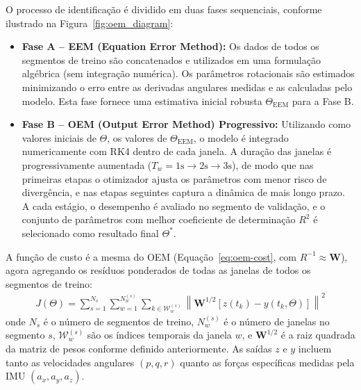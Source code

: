 \documentclass[letterpaper, 10 pt, conference]{ieeeconf}
\begin{document}
O processo de identificação é dividido em duas fases sequenciais, conforme ilustrado na Figura~\ref{fig:oem_diagram}:

\begin{itemize}
    \item \textbf{Fase A -- EEM (Equation Error Method):} Os dados de todos os segmentos de treino são concatenados e utilizados em uma formulação algébrica (sem integração numérica). Os parâmetros rotacionais são estimados minimizando o erro entre as derivadas angulares medidas e as calculadas pelo modelo. Esta fase fornece uma estimativa inicial robusta $\Theta_{\text{EEM}}$ para a Fase B.
    \item \textbf{Fase B -- OEM (Output Error Method) Progressivo:} Utilizando como valores iniciais de $\Theta$, os valores de $\Theta_{\text{EEM}}$, o modelo é integrado numericamente com RK4 dentro de cada janela. A duração das janelas é progressivamente aumentada ($T_w = 1\text{s} \to 2\text{s} \to 3\text{s}$), de modo que nas primeiras etapas o otimizador ajusta os parâmetros com menor risco de divergência, e nas etapas seguintes captura a dinâmica de mais longo prazo. A cada estágio, o desempenho é avaliado no segmento de validação, e o conjunto de parâmetros com melhor coeficiente de determinação $R^2$ é selecionado como resultado final $\Theta^*$.
\end{itemize}

A função de custo é a mesma do OEM (Equação~\eqref{eq:oem-cost}, com $R^{-1} \approx \mathbf{W}$), agora agregando os resíduos ponderados de todas as janelas de todos os segmentos de treino:
\begin{align}
J(\Theta) = \sum_{s=1}^{N_s} \sum_{w=1}^{N_w^{(s)}} \sum_{k \in \mathcal{W}_w^{(s)}} \left\| \mathbf{W}^{1/2} \left[ z(t_k) - y(t_k, \Theta) \right] \right\|^2
\end{align}
onde $N_s$ é o número de segmentos de treino, $N_w^{(s)}$ é o número de janelas no segmento $s$, $\mathcal{W}_w^{(s)}$ são os índices temporais da janela $w$, e $\mathbf{W}^{1/2}$ é a raiz quadrada da matriz de pesos conforme definido anteriormente. As saídas $z$ e $y$ incluem tanto as velocidades angulares $(p, q, r)$ quanto as forças específicas medidas pela IMU $(a_x, a_y, a_z)$.
\end{document}
